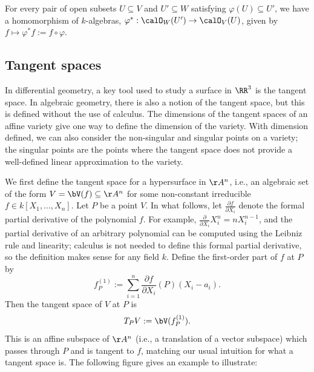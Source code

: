 \documentclass[12pt]{amsart}
\theoremstyle{plain}
\begin{document}
For every pair of open subsets $U \subseteq V$ and $U' \subseteq W$ satisfying $\varphi(U) \subseteq U'$, we have a homomorphism of $k$-algebras, $\varphi^*:\calO_W(U') \to \calO_V(U)$, given by $f \mapsto \varphi^* f := f \circ \varphi.$

\subsection{Tangent spaces}
In differential geometry, a key tool used to study a surface in $\RR^3$ is the tangent space.
In algebraic geometry, there is also a notion of the tangent space, but this is defined without the use of calculus.
The dimensions of the tangent spaces of an affine variety give one way to define the dimension of the variety.
With dimension defined, we can also consider the non-singular and singular points on a variety;
the singular points are the points where the tangent space does not provide a well-defined linear approximation to the variety.

We first define the tangent space for a hypersurface in $\AA^n$, i.e., an algebraic set of the form $V=\bV(f)\subseteq \AA^n$ for some non-constant irreducible $f \in k[X_1,\ldots,X_n]$.
Let $P$ be a point $V$.
In what follows, let $\frac{\partial f}{\partial X_i}$ denote the formal partial derivative of the polynomial $f$.
For example, $\frac{\partial}{\partial X_i} X_i^n = n X_i^{n-1}$, and the partial derivative of an arbitrary polynomial can be computed using the Leibniz rule and linearity;
calculus is not needed to define this formal partial derivative, so the definition makes sense for any field $k$.
Define the first-order part of $f$ at $P$ by
\begin{equation}\label{equationtangent}
f_P^{(1)} := \sum_{i=1}^n \frac{\partial f}{\partial X_i} (P) (X_i-a_i).
\end{equation}
Then the tangent space of $V$ at $P$ is
$$T_PV := \bV(f_P^{(1)}).$$
This is an affine subspace of $\AA^n$ (i.e., a translation of a vector subspace) which passes through $P$ and is tangent to $f$, matching our usual intuition for what a tangent space is.
The following figure gives an example to illustrate:

\end{document}
